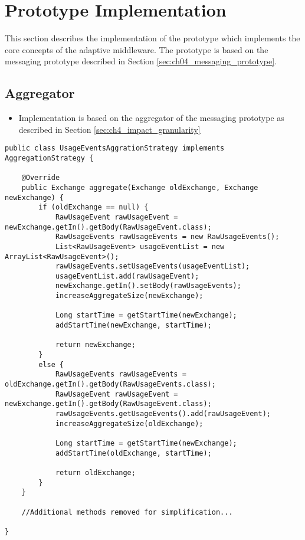 \section{Prototype Implementation}
\label{sec:ch05_prototype}

This section describes the implementation of the prototype which implements the core concepts of the adaptive middleware. The prototype is based on the messaging prototype described in Section \ref{sec:ch04_messaging_prototype}.


\subsection{Aggregator}

\begin{itemize}
	\item Implementation is based on the aggregator of the messaging prototype as described in Section \ref{sec:ch4_impact_granularity}
\end{itemize}

\begin{lstlisting}[caption={UsageEventsAggrationStrategy},label=listing:ch5_UsageEventsAggrationStrategy]
public class UsageEventsAggrationStrategy implements AggregationStrategy {

	@Override
	public Exchange aggregate(Exchange oldExchange, Exchange newExchange) {
		if (oldExchange == null) {
			RawUsageEvent rawUsageEvent = newExchange.getIn().getBody(RawUsageEvent.class);
			RawUsageEvents rawUsageEvents = new RawUsageEvents();
			List<RawUsageEvent> usageEventList = new ArrayList<RawUsageEvent>();
			rawUsageEvents.setUsageEvents(usageEventList);
			usageEventList.add(rawUsageEvent);
			newExchange.getIn().setBody(rawUsageEvents);
			increaseAggregateSize(newExchange);
			
			Long startTime = getStartTime(newExchange);
			addStartTime(newExchange, startTime);
			
			return newExchange;
		}
		else {
			RawUsageEvents rawUsageEvents = oldExchange.getIn().getBody(RawUsageEvents.class);
			RawUsageEvent rawUsageEvent = newExchange.getIn().getBody(RawUsageEvent.class);
			rawUsageEvents.getUsageEvents().add(rawUsageEvent);
			increaseAggregateSize(oldExchange);
			
			Long startTime = getStartTime(newExchange);
			addStartTime(oldExchange, startTime);
			
			return oldExchange;
		}
	}
	
	//Additional methods removed for simplification...
	
}
\end{lstlisting}

